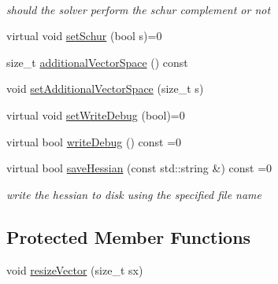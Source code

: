 \begin{DoxyCompactItemize}
$$\begin{DoxyCompactList}\small\item\em should the solver perform the schur complement or not \end{DoxyCompactList}\item 
virtual void \mbox{\hyperlink{classg2o_1_1_solver_a30134c828054375b1cc16ede2a879761}{set\+Schur}} (bool s)=0
\item 
size\+\_\+t \mbox{\hyperlink{classg2o_1_1_solver_ac32a7e75275f6595a66d948a0fc2984a}{additional\+Vector\+Space}} () const
\item 
void \mbox{\hyperlink{classg2o_1_1_solver_ad35b33cee11586c8adea12cd6949f74a}{set\+Additional\+Vector\+Space}} (size\+\_\+t s)
\item 
virtual void \mbox{\hyperlink{classg2o_1_1_solver_ad3ef2a487d991363ba86af2840b0d7cd}{set\+Write\+Debug}} (bool)=0
\item 
virtual bool \mbox{\hyperlink{classg2o_1_1_solver_a0f6f14940eccea0f9bf9e2ea144c9b4d}{write\+Debug}} () const =0
\item 
virtual bool \mbox{\hyperlink{classg2o_1_1_solver_a14852543c4dc3f3e7088efe03aa135eb}{save\+Hessian}} (const std\+::string \&) const =0
\begin{DoxyCompactList}\small\item\em write the hessian to disk using the specified file name \end{DoxyCompactList}\end{DoxyCompactItemize}
\subsection*{Protected Member Functions}
\begin{DoxyCompactItemize}
\item 
void \mbox{\hyperlink{classg2o_1_1_solver_ad1f85839e85f3e2c49112fb7e2b843ad}{resize\+Vector}} (size\+\_\+t sx)
\end{DoxyCompactItemize}
